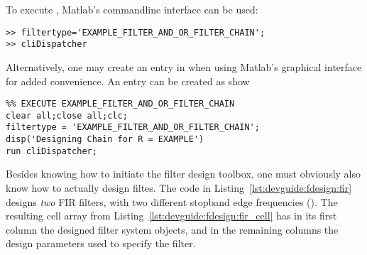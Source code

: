 To execute , Matlab's commandline interface can be used:
\begin{tcolorbox}[
    title={
        \refstepcounter{listing}
        \textbf{Listing \thelisting:} Calling \code{cliDispatcher.m} from Matlab's Commandline Interface
        \label{lst:devguide:fdesign:fir_cell}
        \addcontentsline{lol}{listing}{\protect\numberline{\thelisting}Calling \code{cliDispatcher.m} from Matlab's Commandline Interface}
    }
]
\begin{verbatim}
>> filtertype='EXAMPLE_FILTER_AND_OR_FILTER_CHAIN';
>> cliDispatcher
\end{verbatim}
\end{tcolorbox}
\noindent Alternatively, one  may create an entry  in  when
using Matlab's graphical interface for added convenience. An entry can be created
as show
\begin{tcolorbox}[
    title={
        \refstepcounter{listing}
        \textbf{Listing \thelisting:} Creating an Entry for \code{cliDispatcher.m} in \code{guiWrapper.m}
        \label{lst:devguide:fdesign:fir_cell}
        \addcontentsline{lol}{listing}{\protect\numberline{\thelisting}Creating an Entry for \code{cliDispatcher.m} in \code{guiWrapper.m}}
    }
]
\begin{verbatim}
%% EXECUTE EXAMPLE_FILTER_AND_OR_FILTER_CHAIN
clear all;close all;clc;
filtertype = 'EXAMPLE_FILTER_AND_OR_FILTER_CHAIN';
disp('Designing Chain for R = EXAMPLE')
run cliDispatcher;
\end{verbatim}
\end{tcolorbox}

Besides  knowing  how  to  initiate   the  filter  design  toolbox,  one  must
obviously   also  know   how  to   actually  design   filtes.   The   code  in
Listing~\ref{lst:devguide:fdesign:fir}  designs \emph{two}  FIR filters,  with
two  different stopband  edge  frequencies ().   The resulting  cell
array   from  Listing~\ref{lst:devguide:fdesign:fir_cell} has  in its
first column the designed filter system  objects, and in the remaining columns
the design parameters used to specify the filter.

